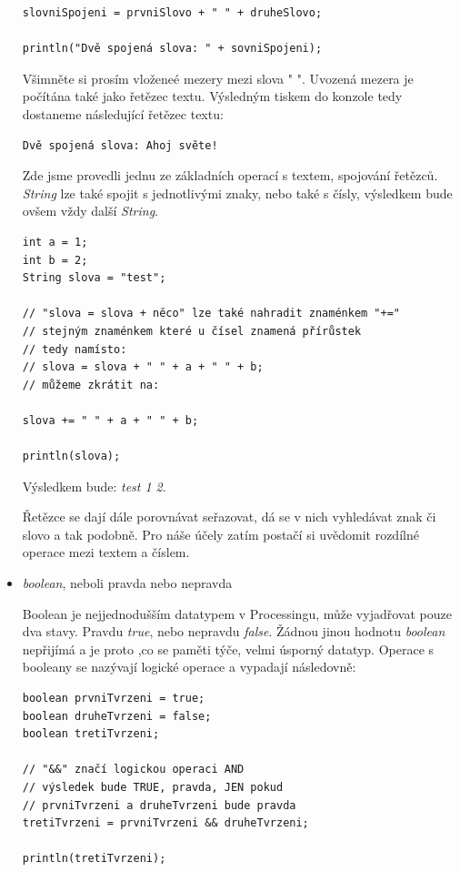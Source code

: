 \documentclass[11pt]{book}
\begin{document}
\begin{itemize}
\begin{lstlisting}
slovniSpojeni = prvniSlovo + " " + druheSlovo;

println("Dvě spojená slova: " + sovniSpojeni);
\end{lstlisting}

Všimněte si prosím vloženeé mezery mezi slova " ". Uvozená mezera je počítána také jako řetězec textu. Výsledným tiskem do konzole tedy dostaneme následující řetězec textu:

\begin{lstlisting}
Dvě spojená slova: Ahoj světe!
\end{lstlisting}

Zde jsme provedli jednu ze základních operací s textem, spojování řetězců. {\em String} lze také spojit s jednotlivými znaky, nebo také s čísly, výsledkem bude ovšem vždy další {\em String}.

\begin{lstlisting}
int a = 1;
int b = 2;
String slova = "test";

// "slova = slova + něco" lze také nahradit znaménkem "+="
// stejným znaménkem které u čísel znamená přírůstek
// tedy namísto:
// slova = slova + " " + a + " " + b;
// můžeme zkrátit na:

slova += " " + a + " " + b;

println(slova);
\end{lstlisting}

Výsledkem bude: {\em test 1 2}.

Řetězce se dají dále porovnávat seřazovat, dá se v nich vyhledávat znak či slovo a tak podobně. Pro náše účely zatím postačí si uvědomit rozdílné operace mezi textem a číslem.


\item{{\em boolean}, neboli pravda nebo nepravda}

Boolean je nejjednodušším datatypem v Processingu, může vyjadřovat pouze dva stavy. Pravdu {\em true}, nebo nepravdu {\em false}. Žádnou jinou hodnotu {\em boolean} nepřijímá a je proto  ,co se paměti týče, velmi úsporný datatyp. Operace s booleany se nazývají logické operace a vypadají následovně:


\begin{lstlisting}
boolean prvniTvrzeni = true;
boolean druheTvrzeni = false;
boolean tretiTvrzeni;

// "&&" značí logickou operaci AND
// výsledek bude TRUE, pravda, JEN pokud
// prvniTvrzeni a druheTvrzeni bude pravda
tretiTvrzeni = prvniTvrzeni && druheTvrzeni;

println(tretiTvrzeni);


\end{lstlisting}
\end{itemize}
\end{document}
